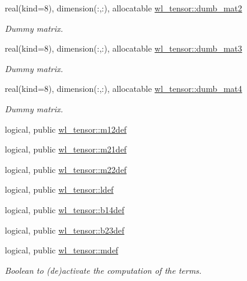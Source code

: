 \begin{DoxyCompactItemize}
real(kind=8), dimension(\+:,\+:), allocatable \hyperlink{namespacewl__tensor_ae3b68a59db71378ea01f2cd20eb9f611}{wl\+\_\+tensor\+::dumb\+\_\+mat2}
\begin{DoxyCompactList}\small\item\em Dummy matrix. \end{DoxyCompactList}\item 
real(kind=8), dimension(\+:,\+:), allocatable \hyperlink{namespacewl__tensor_a489cd37af9ca5ee74e61c60c0e79830f}{wl\+\_\+tensor\+::dumb\+\_\+mat3}
\begin{DoxyCompactList}\small\item\em Dummy matrix. \end{DoxyCompactList}\item 
real(kind=8), dimension(\+:,\+:), allocatable \hyperlink{namespacewl__tensor_a1f1d3c5466015a2fa24afa056c19a4e3}{wl\+\_\+tensor\+::dumb\+\_\+mat4}
\begin{DoxyCompactList}\small\item\em Dummy matrix. \end{DoxyCompactList}\item 
logical, public \hyperlink{namespacewl__tensor_a57e045045436974aaa5559870608eb8c}{wl\+\_\+tensor\+::m12def}
\item 
logical, public \hyperlink{namespacewl__tensor_a73b5bff23de718d81561d53d941adb9c}{wl\+\_\+tensor\+::m21def}
\item 
logical, public \hyperlink{namespacewl__tensor_aeac41f836563c43a27362aa57da9bd69}{wl\+\_\+tensor\+::m22def}
\item 
logical, public \hyperlink{namespacewl__tensor_af8bcd8abccef10f4c6f0ef9d75fb6ab3}{wl\+\_\+tensor\+::ldef}
\item 
logical, public \hyperlink{namespacewl__tensor_a29f327d70916dfce23a1a2e20799227a}{wl\+\_\+tensor\+::b14def}
\item 
logical, public \hyperlink{namespacewl__tensor_acbe8020d8c3b634f2c677bff0937c593}{wl\+\_\+tensor\+::b23def}
\item 
logical, public \hyperlink{namespacewl__tensor_a3aeca3d529c65d2537167b5384a92fe0}{wl\+\_\+tensor\+::mdef}
\begin{DoxyCompactList}\small\item\em Boolean to (de)activate the computation of the terms. \end{DoxyCompactList}\end{DoxyCompactItemize}
